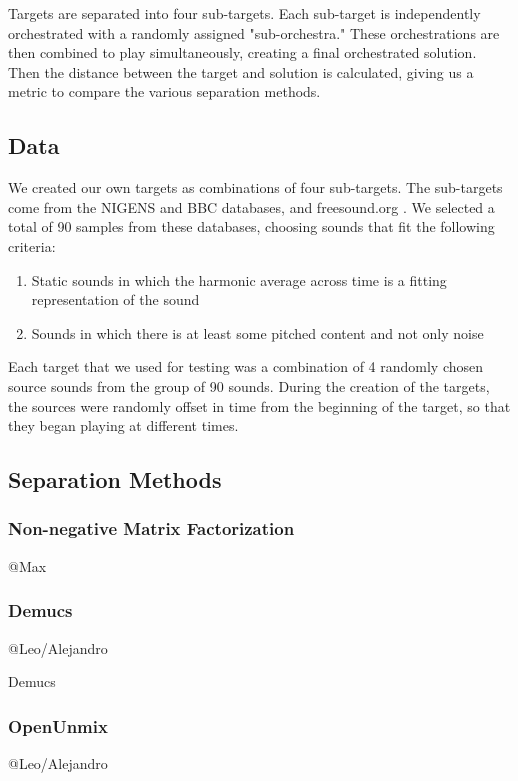 \documentclass{article}
\begin{document}
	Targets are separated into four sub-targets. Each sub-target is independently orchestrated with a randomly assigned "sub-orchestra." These orchestrations are then combined to play simultaneously, creating a final orchestrated solution. Then the distance between the target and solution is calculated, giving us a metric to compare the various separation methods.
	
		\subsection{Data}
		We created our own targets as combinations of four sub-targets. The sub-targets come from the NIGENS \cite{NIGENS} and BBC \cite{BBC} databases, and freesound.org \cite{freesound}. We selected a total of 90 samples from these databases, choosing sounds that fit the following criteria: 
		
		\begin{enumerate}
			\item Static sounds in which the harmonic average across time is a fitting representation of the sound
			\item Sounds in which there is at least some pitched content and not only noise
		\end{enumerate}			
		Each target that we used for testing was a combination of 4 randomly chosen source sounds from the group of 90 sounds. During the creation of the targets, the sources were randomly offset in time from the beginning of the target, so that they began playing at different times.
		
		\subsection{Separation Methods}
	
			\subsubsection{Non-negative Matrix Factorization}
			@Max 
			
			\subsubsection{Demucs}
			@Leo/Alejandro			
			
			Demucs \cite{demucs}
			
			\subsubsection{OpenUnmix}
			@Leo/Alejandro
			
\end{document}
